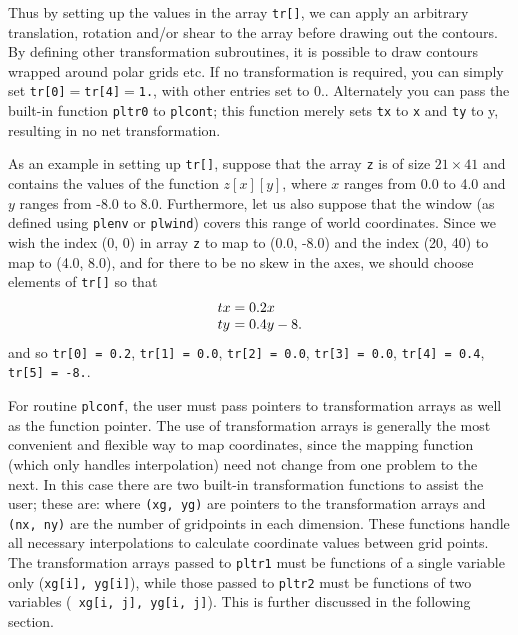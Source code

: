 Thus by setting up the values in the array {\tt tr[]}, we can
apply an arbitrary translation, rotation and/or shear to the array before
drawing out the contours. By defining other transformation subroutines, 
it is possible to draw contours wrapped around polar grids etc.  If no
transformation is required, you can simply set {\tt tr[0]$ = $tr[4]$ = $1.}, 
with other entries set to $0.$.  Alternately you can pass the built-in
function {\tt pltr0} to {\tt plcont}; this function merely sets {\tt *tx}
to {\tt x} and {\tt *ty} to {y}, resulting in no net transformation.

As an example in setting up {\tt tr[]}, suppose that the array {\tt z}
is of size $21 \times 41$ and contains the values of the function
$z[x][y]$, 
where $x$ ranges from 0.0 to 4.0 and $y$ ranges from -8.0 to 8.0.
Furthermore, 
let us also suppose that the window (as defined using {\tt plenv} or
{\tt plwind}) covers this range of world coordinates.
Since we wish the index
(0, 0) in array {\tt z} to map to (0.0, -8.0) and the index (20, 40) to map
to (4.0, 8.0), and for there to be no skew in the axes, we should choose
elements of {\tt tr[]} so that
\[
   \begin{array}{l@{\; = \;}l}
   tx & 0.2x \\
   ty & 0.4y - 8.
   \end{array}
\]
and so {\tt tr[0] = 0.2}, {\tt tr[1] = 0.0}, {\tt tr[2] = 0.0}, 
{\tt tr[3] = 0.0}, {\tt tr[4] = 0.4}, {\tt tr[5] = -8.}.

For routine {\tt plconf}, the user must pass pointers to transformation
arrays as well as the function pointer.  The use of transformation arrays
is generally the most convenient and flexible way to map coordinates, since
the mapping function (which only handles interpolation) need not change
from one problem to the next.  In this case there are two built-in
transformation functions to assist the user; these are:
where {\tt (xg, yg)} are pointers to the transformation arrays and {\tt
(nx, ny)} are the number of gridpoints in each dimension.  These functions
handle all necessary interpolations to calculate coordinate values between
grid points.  The transformation arrays passed to {\tt pltr1} must be
functions of a single variable only ({\tt xg[i], yg[i]}), while those
passed to {\tt pltr2} must be functions of two variables ({\tt
xg[i, j], yg[i, j]}).  This is further discussed in the following section.


